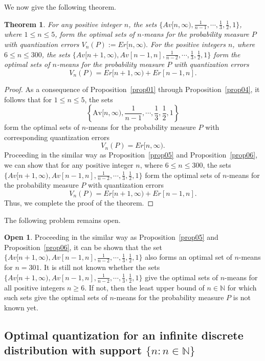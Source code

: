 \documentclass[12pt, reqno]{amsart}
\theoremstyle{plain}
\newtheorem{theorem}[subsection]{Theorem}
\theoremstyle{definition}
\newtheorem{open}[subsection]{Open}
\newcommand{\set}[1]{\{#1\}}%
\newcommand{\D}[1]{\mathbb{#1}}%
\begin{document}
We now give the following theorem.
\begin{theorem} \label{theo1}
For any positive integer $n$, the sets $\set{Av[n, \infty), \frac 1 {n-1},  \cdots, \frac 13, \frac 12, 1}$, where $1\leq n\leq 5$, form the optimal sets of $n$-means for the probability measure $P$ with quantization errors
$V_n(P):=Er[n, \infty).$
For the positive integers $n$, where $6\leq n\leq 300$, the sets $\set{Av[n+1, \infty), Av[n-1, n], \frac 1 {n-2}, \cdots, \frac 13, \frac 12, 1}$ form the optimal sets of $n$-means for the probability measure $P$ with quantization errors
\[V_n(P)=Er[n+1, \infty)+Er[n-1, n].\]
\end{theorem}

\begin{proof}

As a consequence of Proposition~\ref{prop01} through Proposition~\ref{prop04}, it follows that for \( 1 \leq n \leq 5 \), the sets
\[
\left\{ \text{Av}[n, \infty), \frac{1}{n-1}, \cdots, \frac{1}{3}, \frac{1}{2}, 1 \right\}
\]
form the optimal sets of \( n \)-means for the probability measure \( P \) with corresponding quantization errors
\[
V_n(P) = Er[n, \infty).
\]
Proceeding in the similar way as Proposition~\ref{prop05} and Proposition~\ref{prop06}, we can show that for any positive integer $n$, where $6\leq n\leq 300$, the sets $\set{Av[n+1, \infty), Av[n-1, n], \frac 1 {n-2}, \cdots, \frac 13, \frac 12, 1}$ form the optimal sets of $n$-means for the probability measure $P$ with quantization errors
\[V_n(P)=Er[n+1, \infty)+Er[n-1, n].\]
Thus, we complete the proof of the theorem.
\end{proof}

The following problem remains open. 
\begin{open}  
Proceeding in the similar way as Proposition~\ref{prop05} and Proposition~\ref{prop06}, it can be shown that the set $\set{Av[n+1, \infty), Av[n-1, n], \frac 1 {n-2}, \cdots, \frac 13, \frac 12, 1}$ also forms an optimal set of $n$-means for $n=301$. It is still not known whether the sets $\set{Av[n+1, \infty), Av[n-1, n], \frac 1 {n-2}, \cdots, \frac 13, \frac 12, 1}$ give the optimal sets of $n$-means for all positive integers $n\geq 6$. If not, then the least upper bound of $n\in \D N$ for which such sets give the optimal sets of $n$-means for the probability measure $P$ is not known yet.
\end{open}



\subsection{Optimal quantization for an infinite discrete distribution with support $\set{n : n\in \D N}$} \label{sec4}
\end{document}
